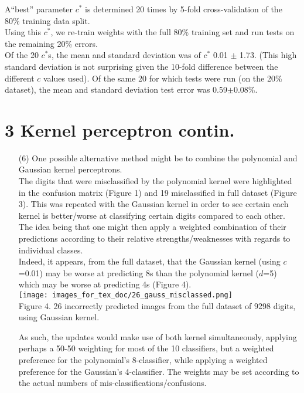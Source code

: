 \documentclass[a4paper,12pt]{article}
\begin{document}
\begin{enumerate}
A``best” parameter $c^*$ is determined 20 times by 5-fold cross-validation of the $80\%$ training data split. \\
Using this $c^*$, we re-train weights with the full $80\%$ training set and run tests on the remaining 20\% errors. \\
Of the 20 $c^*$s, the mean and standard deviation was of $c^*$ 0.01 $\pm$ 1.73. (This high standard deviation is not surprising given the 10-fold difference between the different $c$ values used).
Of the same 20 for which tests were run (on the 20\% dataset), the mean and standard deviation test error was 0.59$\pm$0.08\%.

\end{enumerate}
\clearpage
\section*{3 Kernel perceptron contin.}
\begin{enumerate}
\item[(6)] One possible alternative method might be to combine the polynomial and Gaussian kernel perceptrons. \\
The digits that were misclassified by the polynomial kernel were highlighted in the confusion matrix (Figure 1) and 19 misclassified in full dataset (Figure 3). This was repeated with the Gaussian kernel in order to see certain each kernel is better/worse at classifying certain digits compared to each other. The idea being that one might then apply a weighted combination of their predictions according to their relative strengths/weaknesses with regards to individual classes. \\
Indeed, it appears, from the full dataset, that the Gaussian kernel (using $c$=0.01) may be worse at predicting 8s than the polynomial kernel ($d$=5) which may be worse at predicting 4s (Figure 4).\\
\texttt{[image: images\_for\_tex\_doc/26\_gauss\_misclassed.png]}\\
Figure 4. 26 incorrectly predicted images from the full dataset of 9298 digits, using Gaussian kernel.

As such, the updates would make use of both kernel simultaneously, applying perhaps a 50-50 weighting for most of the 10 classifiers, but a weighted preference for the polynomial's 8-classifier, while applying a weighted preference for the Gaussian's 4-classifier. The weights may be set according to the actual numbers of mis-classifications/confusions.

\end{enumerate}
\clearpage
\end{document}
